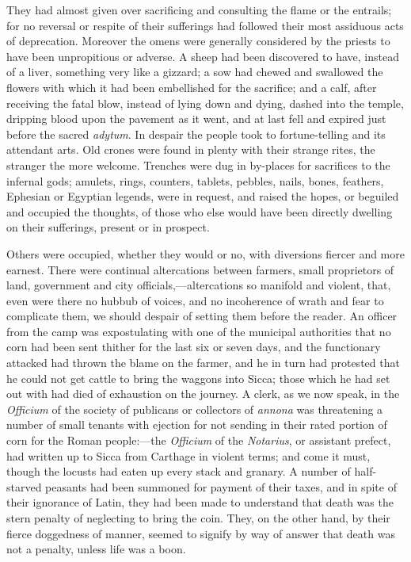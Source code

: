 They had almost given over sacrificing and consulting the flame or
the entrails; for no reversal or respite of their sufferings had
followed their most assiduous acts of deprecation. Moreover the omens
were generally considered by the priests to have been unpropitious or
adverse. A sheep had been discovered to have, instead of a liver,
something very like a gizzard; a sow had chewed and swallowed the
flowers with which it had been embellished for the sacrifice; and a
calf, after receiving the fatal blow, instead of lying down and dying,
dashed into the temple, dripping blood upon the pavement as it went,
and at last fell and expired just before the sacred \emph{adytum}. In
despair the people took to fortune-telling and its attendant arts. Old
crones were found in plenty with their strange rites, the stranger the
more welcome. Trenches were dug in by-places for sacrifices to the
infernal gods; amulets, rings, counters, tablets, pebbles, nails,
bones, feathers, Ephesian or Egyptian legends, were in request, and
raised the hopes, or beguiled and occupied the thoughts, of those who
else would have been directly dwelling on their sufferings, present or
in prospect.

Others were occupied, whether they would or no, with diversions
fiercer and more earnest. There were continual altercations between
farmers, small proprietors of land, government and city officials,—altercations
so manifold and violent, that, even were there no hubbub of
voices, and no incoherence of wrath and fear to complicate them, we
should despair of setting them before the reader. An officer from the
camp was expostulating with one of the municipal authorities that no
corn had been sent thither for the last six or seven days, and the
functionary attacked had thrown the blame on the farmer, and he in
turn had protested that he could not get cattle to bring the waggons
into Sicca; those which he had set out with had died of exhaustion on
the journey. A clerk, as we now speak, in the \emph{Officium} of the
society of publicans or collectors of \emph{annona} was threatening a
number of small tenants with ejection for not sending in their rated
portion of corn for the Roman people:—the \emph{Officium} of the \emph{Notarius},
or assistant prefect, had written up to Sicca from Carthage in violent
terms; and come it must, though the locusts had eaten up every stack
and granary. A number of half-starved peasants had been summoned for
payment of their taxes, and in spite of their ignorance of Latin, they
had been made to understand that death was the stern penalty of
neglecting to bring the coin. They, on the other hand, by their fierce
doggedness of manner, seemed to signify by way of answer that death
was not a penalty, unless life was a boon.

